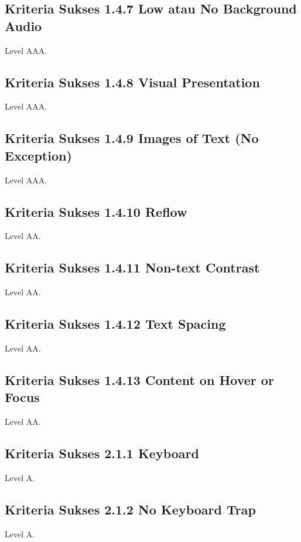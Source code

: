 \subsection{Kriteria Sukses 1.4.7 Low atau No Background Audio}
\label{sec:kriteria_1.4.7}
Level AAA.

\subsection{Kriteria Sukses 1.4.8 Visual Presentation}
\label{sec:kriteria_1.4.8}
Level AAA.

\subsection{Kriteria Sukses 1.4.9 Images of Text (No Exception)}
\label{sec:kriteria_1.4.9}
Level AAA.

\subsection{Kriteria Sukses 1.4.10 Reflow}
\label{sec:kriteria_1.4.10}
Level AA.

\subsection{Kriteria Sukses 1.4.11 Non-text Contrast}
\label{sec:kriteria_1.4.11}
Level AA.

\subsection{Kriteria Sukses 1.4.12 Text Spacing}
\label{sec:kriteria_1.4.12}
Level AA.

\subsection{Kriteria Sukses 1.4.13 Content on Hover or Focus}
\label{sec:kriteria_1.4.13}
Level AA.

\subsection{Kriteria Sukses 2.1.1 Keyboard}
\label{sec:kriteria_2.1.1}
Level A.

\subsection{Kriteria Sukses 2.1.2 No Keyboard Trap}
\label{sec:kriteria_2.1.2}
Level A.

